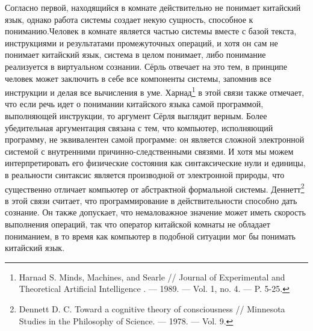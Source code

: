 \documentclass[12pt, specialist, subf, substylefile = spbu.rtx]{disser}
\begin{document}
Согласно первой, находящийся в комнате действительно не понимает китайский язык, однако работа системы создает некую сущность, способное к пониманию.Человек в комнате является частью системы вместе с базой текста, инструкциями и результатами промежуточных операций, и хотя он сам не понимает китайский язык, система в целом понимает, либо понимание реализуется в виртуальном сознании.  Сёрль отвечает на это тем, в принципе человек может заключить в себе все компоненты системы, запомнив все инструкции и делая все вычисления в уме. Харнад\footnote{\cite{Harnad1989-HARMMA-3} Harnad S. Minds, Machines, and Searle // Journal of Experimental and Theoretical Artificial Intelligence . — 1989. — Vol. 1, no. 4. — P. 5-25.} в этой связи также отмечает, что если речь идет о понимании китайского языка самой программой, выполняющей инструкции, то аргумент Сёрля выглядит верным. Более убедительная аргументация связана с тем, что компьютер, исполняющий программу, не эквивалентен самой программе: он является сложной электронной системой с внутренними причинно-следственными связями. И хотя мы можем интерпретировать его физические состояния как синтаксические нули и единицы, в реальности синтаксис является производной от электронной природы, что существенно отличает компьютер от абстрактной формальной системы. Деннетт\footnote{\cite{Dennett1978-DENTAC} Dennett D. C. Toward a cognitive theory of consciousness // Minnesota Studies in the Philosophy of Science. — 1978. — Vol. 9.} в этой связи считает, что программирование в действительности способно дать сознание. Он также допускает, что немаловажное значение может иметь скорость выполнения операций, так что оператор китайской комнаты не обладает пониманием, в то время как компьютер в подобной ситуации мог бы понимать китайский язык.
\end{document}
